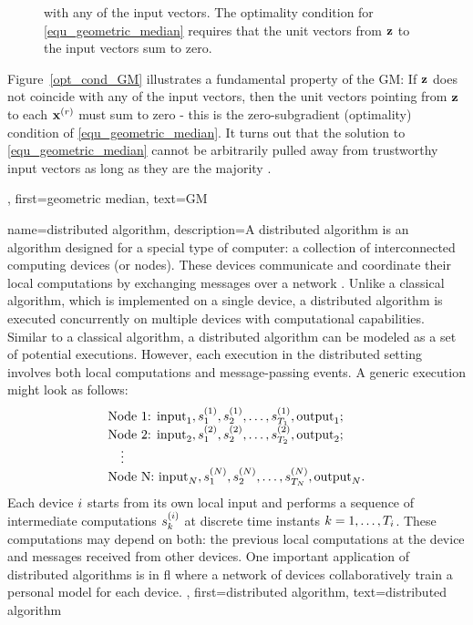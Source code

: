 {{\begin{figure}[H]
\begin{center}
{					with any of the input vectors. The optimality condition for \eqref{equ_geometric_median} 
					requires that the unit vectors from ${\bf z}$ to the input vectors sum to zero.}
			\end{center}
		\end{figure}
		Figure~\ref{opt_cond_GM} illustrates a fundamental property of the GM:
		If ${\bf z}$ does not coincide with any of the input vectors, then the unit vectors pointing 
		from ${\bf z}$ to each ${\bf x}^{(r)}$ must sum to zero - this is the zero-\gls{subgradient}  
		(optimality) condition of \eqref{equ_geometric_median}. It turns out that the solution to 
		\eqref{equ_geometric_median} cannot be arbitrarily pulled away from trustworthy input vectors as long as they 
		are the majority \cite[Th. 2.2]{Lopuhaae1991}.},
	first={geometric median},
	text={GM}
}

{name={distributed algorithm},
	description={A distributed \gls{algorithm} is an \gls{algorithm} designed for 
		a special type of computer: a collection of interconnected computing devices (or nodes). 
		These devices communicate and coordinate their local computations by exchanging 
		messages over a network \cite{IntroDistAlg,ParallelDistrBook}. Unlike a classical \gls{algorithm}, 
		which is implemented on a single \gls{device}, a distributed \gls{algorithm} is 
		executed concurrently on multiple \gls{device}s with computational capabilities. 
		Similar to a classical \gls{algorithm}, a distributed \gls{algorithm} can be modeled as a 
		set of potential executions. However, each execution in the distributed setting involves 
		both local computations and message-passing events. A generic execution might look as 
		follows:
		\[
		\begin{array}{l}
			\text{Node 1: } {\rm input}_1, s_1^{(1)}, s_2^{(1)}, \ldots, s_{T_1}^{(1)}, {\rm output}_1; \\
			\text{Node 2: } {\rm input}_2, s_1^{(2)}, s_2^{(2)}, \ldots, s_{T_2}^{(2)}, {\rm output}_2; \\
			\quad \vdots \\
			\text{Node N: } {\rm input}_N, s_1^{(N)}, s_2^{(N)}, \ldots, s_{T_N}^{(N)}, {\rm output}_N.
		\end{array}
		\]
		Each \gls{device} $i$ starts from its own local input and performs a sequence of 
		intermediate computations $s_{k}^{(i)}$ at discrete time instants $k = 1, \dots, T_i$. 
		These computations may depend on both: the previous local computations at the \gls{device} 
		and messages received from other \gls{device}s. One important application of distributed 
		\gls{algorithm}s is in \gls{fl} where a network of \gls{device}s collaboratively train a personal \gls{model} 
		for each \gls{device}. 
		},
	first={distributed algorithm}, text={distributed algorithm}
}


